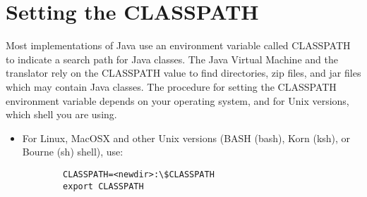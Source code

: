 \section{Setting the CLASSPATH}\label{install_classpath}
Most implementations of Java use an environment variable called CLASSPATH to indicate a search path for Java classes. The Java Virtual Machine and the \nr{} translator rely on the CLASSPATH value to find directories, zip files, and jar files which may contain Java classes. 
The procedure for setting the CLASSPATH environment variable depends
on your operating system, and for Unix versions, which shell you are using.
\begin{itemize}
\item For Linux, MacOSX and other Unix versions (BASH (bash), Korn
  (ksh), or Bourne (sh) shell), use:
\begin{verbatim}
        CLASSPATH=<newdir>:\$CLASSPATH 
        export CLASSPATH
\end{verbatim}


\end{itemize}
